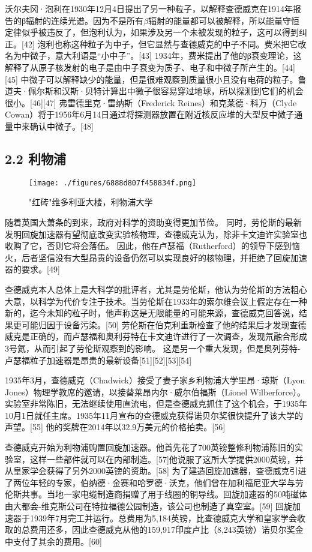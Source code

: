 沃尔夫冈·泡利在1930年12月4日提出了另一种粒子，以解释查德威克在1914年报告的β辐射的连续光谱。因为不是所有$\beta$辐射的能量都可以被解释，所以能量守恒定律似乎被违反了，但泡利认为，如果涉及另一个未被发现的粒子，这可以得到纠正。[42] 泡利也称这种粒子为中子，但它显然与查德威克的中子不同。费米把它改名为中微子，意大利语是“小中子”。[43] 1934年，费米提出了他的β衰变理论，这解释了从原子核发射的电子是由中子衰变为质子、电子和中微子所产生的。[44][45] 中微子可以解释缺少的能量，但是很难观察到质量很小且没有电荷的粒子。鲁道夫·佩尔斯和汉斯·贝特计算出中微子很容易穿过地球，所以探测到它们的机会很小。[46][47] 弗雷德里克·雷纳斯（Frederick Reines）和克莱德·科万（Clyde Cowan）将于1956年6月14日通过将探测器放置在附近核反应堆的大型反中微子通量中来确认中微子。[48]

\subsection{2.2 利物浦}
\begin{figure}[ht]
\centering
\texttt{[image: ./figures/6888d807f458834f.png]}
\caption{"红砖"维多利亚大楼，利物浦大学} \label{fig_CHFR_4}
\end{figure}
随着英国大萧条的到来，政府对科学的资助变得更加节俭。 同时，劳伦斯的最新发明回旋加速器有望彻底改变实验核物理，查德威克认为，除非卡文迪许实验室也收购了它，否则它将会落伍。 因此，他在卢瑟福（Rutherford）的领导下感到恼火，后者坚信没有大型昂贵的设备仍然可以实现良好的核物理，并拒绝了回旋加速器的要求。[49]

查德威克本人总体上是大科学的批评者，尤其是劳伦斯，他认为劳伦斯的方法粗心大意，以科学为代价专注于技术。当劳伦斯在1933年的索尔维会议上假定存在一种新的，迄今未知的粒子时，他声称这是无限能量的可能来源，查德威克回答说，结果更可能归因于设备污染。[50] 劳伦斯在伯克利重新检查了他的结果后才发现查德威克是正确的，而卢瑟福和奥利芬特在卡文迪许进行了一次调查，发现氘融合形成3号氦，从而引起了劳伦斯观察到的影响。 这是另一个重大发现，但是奥列芬特-卢瑟福粒子加速器是昂贵的最新设备[51][52][53][54]

1935年3月，查德威克（Chadwick）接受了妻子家乡利物浦大学里昂·琼斯（Lyon Jones）物理学教席的邀请，以接替莱昂内尔·威尔伯福斯（Lionel Wilberforce）。 实验室非常陈旧，无法继续使用直流电，但是查德威克抓住了这个机会，于1935年10月1日就任主席。1935年11月宣布的查德威克获得诺贝尔奖很快提升了该大学的声望。[55] 他的奖牌在2014年以32.9万美元的价格拍卖。[56]

查德威克开始为利物浦购置回旋加速器。他首先花了700英镑整修利物浦陈旧的实验室，这样一些部件就可以在内部制造。[57]他说服了这所大学提供2000英镑，并从皇家学会获得了另外2000英镑的资助。[58] 为了建造回旋加速器，查德威克引进了两位年轻的专家，伯纳德·金赛和哈罗德·沃克，他们曾在加利福尼亚大学与劳伦斯共事。当地一家电缆制造商捐赠了用于线圈的铜导线。回旋加速器的50吨磁体由大都会-维克斯公司在特拉福德公园制造，该公司也制造了真空室。[59] 回旋加速器于1939年7月完工并运行。总费用为5,184英镑，比查德威克大学和皇家学会收取的总费用还多，因此查德威克从他的159,917印度卢比（8,243英镑）诺贝尔奖金中支付了其余的费用。[60]

